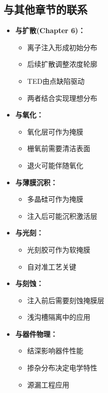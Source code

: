 \documentclass[UTF8,12pt,a4paper]{ctexart}
\begin{document}
\subsection{与其他章节的联系}

\begin{itemize}
    \item \textbf{与扩散(Chapter 6)：}
    \begin{itemize}
        \item 离子注入形成初始分布
        \item 后续扩散调整浓度轮廓
        \item TED由点缺陷驱动
        \item 两者结合实现理想分布
    \end{itemize}
    
    \item \textbf{与氧化：}
    \begin{itemize}
        \item 氧化层可作为掩膜
        \item 栅氧前需要清洁表面
        \item 退火可能伴随氧化
    \end{itemize}
    
    \item \textbf{与薄膜沉积：}
    \begin{itemize}
        \item 多晶硅可作为掩膜
        \item 注入后可能沉积激活层
    \end{itemize}
    
    \item \textbf{与光刻：}
    \begin{itemize}
        \item 光刻胶可作为软掩膜
        \item 自对准工艺关键
    \end{itemize}
    
    \item \textbf{与刻蚀：}
    \begin{itemize}
        \item 注入前后需要刻蚀掩膜层
        \item 浅沟槽隔离中的应用
    \end{itemize}
    
    \item \textbf{与器件物理：}
    \begin{itemize}
        \item 结深影响器件性能
        \item 掺杂分布决定电学特性
        \item 源漏工程应用
    \end{itemize}
\end{itemize}
\end{document}
